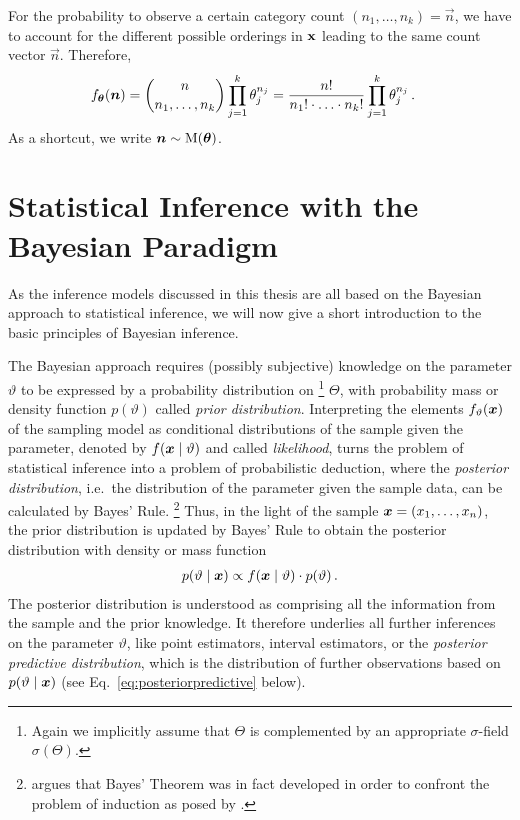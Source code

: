For the probability to observe a certain category count $(n_1, \ldots, n_k) = \vec{n}$,
we have to account for the different possible orderings in $\mathbf{x}$ leading to the same count vector $\vec{n}$.
Therefore,
\begin{align}\label{eq:multinomdens}
f_{\boldsymbol{\theta}}({\bm n}) &= \binom{n}{n_1,\ldots,n_k} \prod_{j=1}^k \theta_j^{n_j}
                      = \frac{n!}{n_1!\cdot \ldots \cdot n_k!} \prod_{j=1}^k \theta_j^{n_j}\,.
\end{align}
As a shortcut, we write ${\bm n} \sim \operatorname{M}(\boldsymbol{\theta})$.


\section{Statistical Inference with the Bayesian Paradigm}
\label{sec:bayes-inference}

As the inference models discussed in this thesis are all based on the Bayesian approach to statistical inference,
we will now give a short introduction to the basic principles of Bayesian inference.

The Bayesian approach requires (possibly subjective) knowledge on the parameter $\vartheta$ to be expressed by a probability distribution on%
\footnote{Again we implicitly assume that $\Theta$ is complemented by an appropriate $\sigma$-field $\sigma(\Theta)$.}
$\Theta$, with probability mass or density function $p(\vartheta)$ called \emph{prior distribution}.
Interpreting the elements $f_\vartheta({\bm x})$ of the sampling model as conditional distributions of the sample given the parameter,
denoted by $f({\bm x}\mid\vartheta)$ and called \emph{likelihood},
turns the problem of statistical inference into a problem of probabilistic deduction,
where the \emph{posterior distribution}, i.e.\ the distribution of the parameter given the sample data,
can be calculated by Bayes' Rule.%
\footnote{\citeauthor{1987:gillies}  argues
that Bayes' Theorem was in fact developed in order to confront the problem of induction as posed by \textcite{1739:hume}.}
Thus, in the light of the sample ${\bm x}= (x_1, \ldots, x_n)$, the prior distribution is updated by Bayes' Rule
to obtain the posterior distribution with density or mass function
\begin{align}
\label{eq:bayesrule}
p(\vartheta\mid{\bm x}) \propto f({\bm x}\mid\vartheta) \cdot p(\vartheta)\,.
\end{align}
The posterior distribution is understood as comprising all the information from the sample and the prior knowledge.
It therefore underlies all further inferences on the parameter $\vartheta$,
like point estimators, interval estimators,
or the \emph{posterior predictive distribution},
which is the distribution of further observations based on $p(\vartheta\mid{\bm x})$
(see Eq.~\eqref{eq:posteriorpredictive} below).


